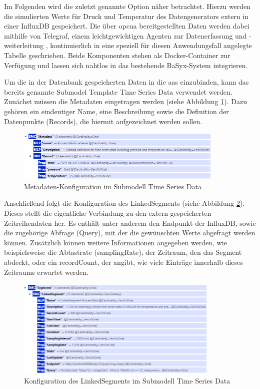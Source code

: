 Im Folgenden wird die zuletzt genannte Option näher betrachtet.
Hierzu werden die simulierten Werte für Druck und Temperatur des Datengenerators extern in einer InfluxDB gespeichert.
Die über \acs{opcua} bereitgestellten Daten werden dabei mithilfe von Telegraf, einem leichtgewichtigen Agenten zur Datenerfassung und -weiterleitung \cite{Influx}, kontinuierlich in eine speziell für diesen Anwendungsfall angelegte Tabelle geschrieben.
Beide Komponenten stehen als Docker-Container zur Verfügung und lassen sich nahtlos in das bestehende BaSyx-System integrieren.

Um die in der Datenbank gespeicherten Daten in die \acs{aas} einzubinden, kann das bereits genannte Submodel Template Time Series Data verwendet werden.
Zunächst müssen die Metadaten eingetragen werden (siehe Abbildung \ref{fig:MetadataTimeSeries}).
Dazu gehören ein eindeutiger Name, eine Beschreibung sowie die Definition der Datenpunkte (Records), die hiermit aufgezeichnet werden sollen.

\begin{figure}[htbp]
    \centering
    \includegraphics[width=0.88\textwidth]{Bilder/TimeSeries/MetadataTimeSeries.PNG}
    \caption{Metadaten-Konfiguration im Submodell Time Series Data}
    \label{fig:MetadataTimeSeries}
\end{figure}

Anschließend folgt die Konfiguration des LinkedSegments (siehe Abbildung \ref{fig:LinkedSegmentTimeSeries}). 
Dieses stellt die eigentliche Verbindung zu den extern gespeicherten Zeitreihendaten her.
Es enthält unter anderem den Endpunkt der InfluxDB, sowie die zugehörige Abfrage (Query), mit der die gewünschten Werte abgefragt werden können.
Zusätzlich können weitere Informationen angegeben werden, wie beispielsweise die Abtastrate (samplingRate), der Zeitraum, den das Segment abdeckt, oder ein recordCount, der angibt, wie viele Einträge innerhalb dieses Zeitraums erwartet werden.

\begin{figure}[htbp]
    \centering
    \includegraphics[width=0.86\textwidth]{Bilder/TimeSeries/LinkedSegment.PNG}
    \caption{Konfiguration des LinkedSegments im Submodell Time Series Data}
    \label{fig:LinkedSegmentTimeSeries}
\end{figure}

